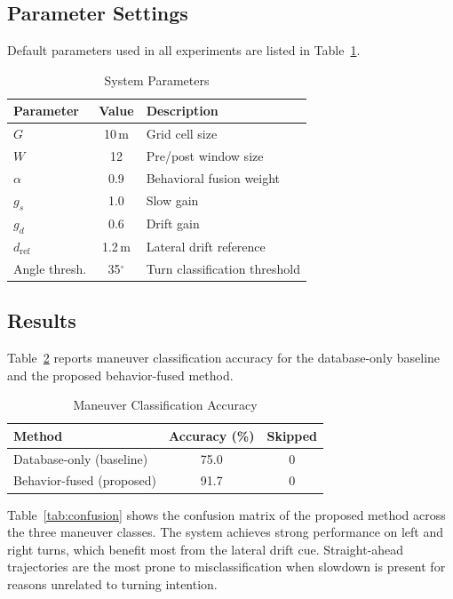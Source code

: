 \documentclass[conference]{IEEEtran}
\begin{document}
\subsection{Parameter Settings}
Default parameters used in all experiments are listed in Table~\ref{tab:params}.

\begin{table}[htbp]
\caption{System Parameters}
\label{tab:params}
\begin{center}
\begin{tabular}{|l|c|l|}
\hline
\textbf{Parameter} & \textbf{Value} & \textbf{Description} \\
\hline
$G$ & 10\,m & Grid cell size \\
$W$ & 12 & Pre/post window size \\
$\alpha$ & 0.9 & Behavioral fusion weight \\
$g_s$ & 1.0 & Slow gain \\
$g_d$ & 0.6 & Drift gain \\
$d_{\mathrm{ref}}$ & 1.2\,m & Lateral drift reference \\
Angle thresh. & 35$^\circ$ & Turn classification threshold \\
\hline
\end{tabular}
\end{center}
\end{table}

\subsection{Results}

Table~\ref{tab:results} reports maneuver classification accuracy for the database-only baseline and the proposed behavior-fused method.

\begin{table}[htbp]
\caption{Maneuver Classification Accuracy}
\label{tab:results}
\begin{center}
\begin{tabular}{|l|c|c|}
\hline
\textbf{Method} & \textbf{Accuracy (\%)} & \textbf{Skipped} \\
\hline
Database-only (baseline) & 75.0 & 0 \\
Behavior-fused (proposed) & 91.7 & 0 \\
\hline
\end{tabular}
\end{center}
\end{table}

Table~\ref{tab:confusion} shows the confusion matrix of the proposed method across the three maneuver classes. 
The system achieves strong performance on left and right turns, which benefit most from the lateral drift cue.
Straight-ahead trajectories are the most prone to misclassification when slowdown is present for reasons unrelated to turning intention.
\end{document}
